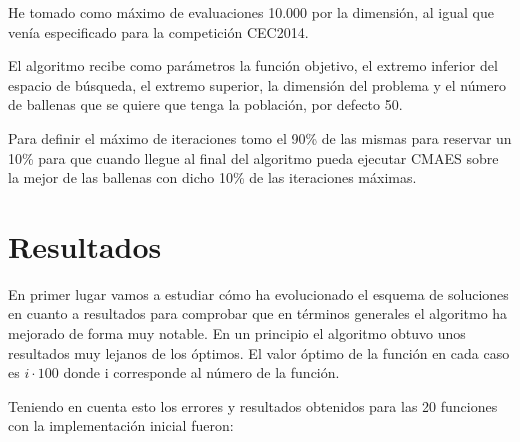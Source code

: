 \documentclass[12pt,a4paper]{article}
\begin{document}
	He tomado como máximo de evaluaciones 10.000 por la dimensión, al igual que venía especificado para la competición CEC2014.

	El algoritmo recibe como parámetros la función objetivo, el extremo inferior del espacio de búsqueda, el extremo superior, la dimensión del problema y el número de ballenas que se quiere que tenga la población, por defecto 50.
	
	Para definir el máximo de iteraciones tomo el 90\% de las mismas para reservar un 10\% para que cuando llegue al final del algoritmo pueda ejecutar CMAES sobre la mejor de las ballenas con dicho 10\% de las iteraciones máximas.
	
	\section{Resultados}
	\label{sec:resultados}
	
	En primer lugar vamos a estudiar cómo ha evolucionado el esquema de soluciones en cuanto a resultados para comprobar que en términos generales el algoritmo ha mejorado de forma muy notable. En un principio el algoritmo obtuvo unos resultados muy lejanos de los óptimos. El valor óptimo de la función en cada caso es $i\cdot 100$ donde i corresponde al número de la función.
	
	Teniendo en cuenta esto los errores y resultados obtenidos para las 20 funciones con la implementación inicial fueron:
	
\end{document}
